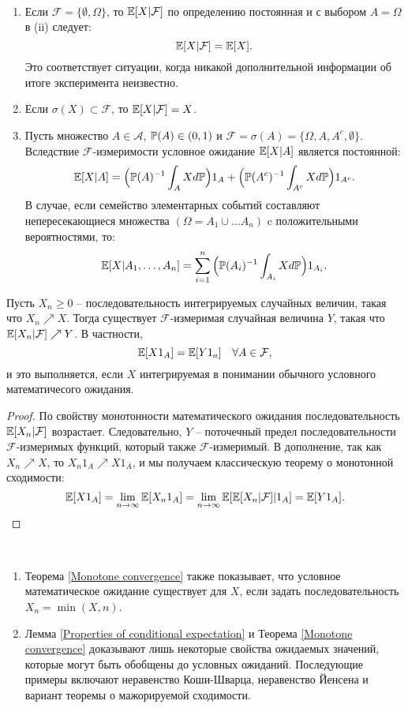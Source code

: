 \begin{exmp} \
	\begin{enumerate}
		\item Если $\mathcal{F}= \{\emptyset, \Omega \}$, то $\mathbb{E}[X|\mathcal{F}]$ по определению постоянная и с выбором $A=\Omega$ в (ii) следует:
		\[\mathbb{E}[X | \mathcal{F}]=\mathbb{E}[X]. \]
		Это соответствует ситуации, когда никакой дополнительной информации об итоге эксперимента неизвестно.
		\item Если $\sigma(X) \subset \mathcal{F}$, то $\mathbb{E}[X|\mathcal{F}]=X$.
		\item Пусть множество $A \in \mathcal{A}$, $\mathbb{P}(A) \in (0, 1)$ и $\mathcal{F}=\sigma(A)=\{\Omega, A, A^c, \emptyset \}$. Вследствие $\mathcal{F}$-измеримости условное ожидание $\mathbb{E}[X|A]$ является постоянной:
		\[\mathbb{E}[X|A]=\Big(\mathbb{P}(A)^{-1} \int_A X d\mathbb{P}\Big)1_A + \Big(\mathbb{P}(A^c)^{-1} \int_{A^c} X d\mathbb{P}\Big)1_{A^c}. \]
		В случае, если семейство элементарных событий составляют непересекающиеся множества $(\Omega = A_1 \cup \dots A_n)$ c положительными вероятностями, то:
		\[\mathbb{E}[X|A_1, \dots , A_n] = \sum_{i=1}^n \Big(\mathbb{P}(A_i)^{-1} \int_{A_i} X d\mathbb{P}\Big)1_{A_i}. \]
	\end{enumerate}
\end{exmp}

\begin{thm} \label{Monotone convergence}
	Пусть $X_n \geq 0$ -- последовательность интегрируемых случайных величин, такая что $X_n \nearrow X$. Тогда существует $\mathcal{F}$-измеримая случайная величина $Y$, такая что $\mathbb{E}[X_n|\mathcal{F}] \nearrow Y$. В частности,
	\[ \mathbb{E}[X1_A]=\mathbb{E}[Y1_a] \quad \forall A \in \mathcal{F}, \]
	и это выполняется, если $X$ интегрируемая в понимании обычного условного математичесого ожидания.
\end{thm}

\begin{proof}
	По свойству монотонности математического ожидания последовательность $\mathbb{E}[X_n|\mathcal{F}]$ возрастает. Следовательно, $Y$ -- поточечный предел последовательности $\mathcal{F}$-измеримых функций, который также $\mathcal{F}$-измеримый. В дополнение, так как $X_n \nearrow X$, то $X_n1_A \nearrow X1_A$, и мы получаем классическую теорему о монотонной сходимости:
	\[ \mathbb{E}[X1_A]=\lim\limits_{n \rightarrow \infty}\mathbb{E}[X_n1_A]=\lim\limits_{n \rightarrow \infty}\mathbb{E}[\mathbb{E}[X_n|\mathcal{F}]|1_A]=\mathbb{E}[Y1_A]. \]
\end{proof}

\begin{rmrk} \
	\begin{enumerate}
		\item Теорема \ref{Monotone convergence} также показывает, что условное математическое ожидание существует для $X$, если задать последовательность $X_n=\min(X,n)$.
		\item Лемма \ref{Properties of conditional expectation} и Теорема \ref{Monotone convergence} доказывают лишь некоторые свойства ожидаемых значений, которые могут быть обобщены до условных ожиданий. Последующие примеры включают неравенство Коши-Шварца, неравенство Йенсена и вариант теоремы о мажорируемой сходимости.
	\end{enumerate}
\end{rmrk}

